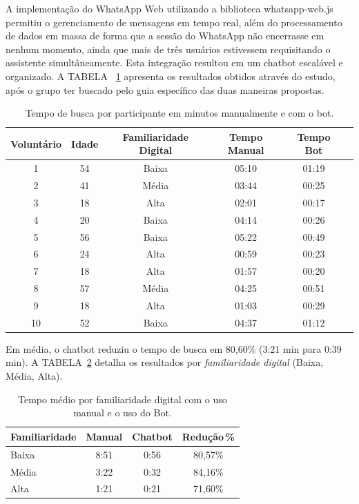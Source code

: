 \documentclass[a4paper,11pt]{article} %
\begin{document}
A implementação do WhatsApp Web utilizando a biblioteca whatsapp-web.js permitiu o gerenciamento de mensagens em tempo real, além do processamento de dados em massa de forma que a sessão do WhatsApp não encerrasse em nenhum momento, ainda que mais de três usuários estivessem requisitando o assistente simultâneamente. Esta integração resultou em um chatbot escalável e organizado. A TABELA ~\ref{tab:busca-participante} apresenta os resultados obtidos através do estudo, após o grupo ter buscado pelo guia específico das duas maneiras propostas.


\begin{table}[H]
  \centering
  \captionsetup{justification=raggedright, singlelinecheck=false}
  \caption{Tempo de busca por participante em minutos manualmente e com o bot.}
  \label{tab:busca-participante}
  \begin{tabular}{c c c c c c}
    \hline
    \textbf{Voluntário} & \textbf{Idade} & \textbf{Familiaridade Digital} & \textbf{Tempo Manual} & \textbf{Tempo Bot}  \\
    \hline
    1   & 54 & Baixa       & 05:10 & 01:19  \\
    2    & 41 & Média         & 03:44 & 00:25  \\
    3        & 18 & Alta         & 02:01 & 00:17 \\
     4       & 20 & Baixa           & 04:14 & 00:26  \\ 
     5       & 56 & Baixa          & 05:22 & 00:49
        \\
       6        & 24 & Alta          & 00:59 & 00:23  \\
        7       & 18 & Alta         & 01:57 & 00:20 \\
        8       & 57 & Média          & 04:25 & 00:51  \\
        9       & 18 & Alta           & 01:03 & 00:29
        \\
        10      & 52 & Baixa       & 04:37 & 01:12 \\
    \hline
  \end{tabular}
  
\end{table}

Em média, o chatbot reduziu o tempo de busca em 80{,}60\%
(3:21 min para 0:39 min). A TABELA~\ref{tab:tempo-familiaridade} detalha os resultados por
\emph{familiaridade digital} (Baixa, Média, Alta).

\begin{table}[H]
  \centering
  \captionsetup{justification=raggedright, singlelinecheck=false}
  \caption{Tempo médio por familiaridade digital com o uso manual e o uso do Bot.}
  \label{tab:tempo-familiaridade}
  \begin{tabular}{lccc}
    \hline
    \textbf{Familiaridade} & \textbf{Manual} & \textbf{Chatbot} & \textbf{Redução}\,\textbf{\%} \\
    \hline
    Baixa  & 8:51 & 0:56 & 80,57\% \\
    Média  & 3:22 & 0:32 & 84,16\% \\
    Alta   & 1:21 & 0:21 & 71,60\% \\
    \hline
  \end{tabular}
\end{table}
\end{document}
